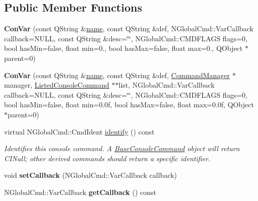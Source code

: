 \subsection*{Public Member Functions}
\begin{DoxyCompactItemize}
\item 
\hypertarget{class_con_var_ac437fec999dde2751271c7c1e400d89d}{{\bfseries Con\-Var} (const Q\-String \&\hyperlink{class_base_console_command_a2f21764f46a3864a362eae2e3396e363}{name}, const Q\-String \&def, N\-Global\-Cmd\-::\-Var\-Callback callback=N\-U\-L\-L, const Q\-String \&desc=\char`\"{}\char`\"{}, N\-Global\-Cmd\-::\-C\-M\-D\-F\-L\-A\-G\-S flags=0, bool has\-Min=false, float min=0., bool has\-Max=false, float max=0., Q\-Object $\ast$parent=0)}\label{class_con_var_ac437fec999dde2751271c7c1e400d89d}

\item 
\hypertarget{class_con_var_a6755a812d1e97a6524c26a703e480359}{{\bfseries Con\-Var} (const Q\-String \&\hyperlink{class_base_console_command_a2f21764f46a3864a362eae2e3396e363}{name}, const Q\-String \&def, \hyperlink{class_command_manager}{Command\-Manager} $\ast$manager, \hyperlink{class_listed_console_command}{Listed\-Console\-Command} $\ast$$\ast$list, N\-Global\-Cmd\-::\-Var\-Callback callback=N\-U\-L\-L, const Q\-String \&desc=\char`\"{}\char`\"{}, N\-Global\-Cmd\-::\-C\-M\-D\-F\-L\-A\-G\-S flags=0, bool has\-Min=false, float min=0.\-0f, bool has\-Max=false, float max=0.\-0f, Q\-Object $\ast$parent=0)}\label{class_con_var_a6755a812d1e97a6524c26a703e480359}

\item 
virtual N\-Global\-Cmd\-::\-Cmd\-Ident \hyperlink{class_con_var_a0d2fb6068e6fa0ac6b1655327c453d6b}{identify} () const 
\begin{DoxyCompactList}\small\item\em Identifies this console command. A \hyperlink{class_base_console_command}{Base\-Console\-Command} object will return C\-I\-Null; other derived commands should return a specific identifier. \end{DoxyCompactList}\item 
\hypertarget{class_con_var_a7521050905d25ae719fc4e97924047ea}{void {\bfseries set\-Callback} (N\-Global\-Cmd\-::\-Var\-Callback callback)}\label{class_con_var_a7521050905d25ae719fc4e97924047ea}

\item 
\hypertarget{class_con_var_a01a4f437684d3120d5a510b821b35f60}{N\-Global\-Cmd\-::\-Var\-Callback {\bfseries get\-Callback} () const }\label{class_con_var_a01a4f437684d3120d5a510b821b35f60}


\end{DoxyCompactItemize}
